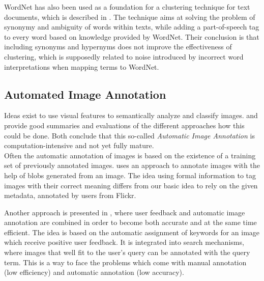 \bigskip
WordNet has also been used as a foundation for a clustering technique for text documents, which is described in \cite{sedding2004wordnet}. The technique aims at solving the problem of synonymy and ambiguity of words within texts, while adding a part-of-speech tag to every word based on knowledge provided by WordNet. Their conclusion is that including synonyms and hypernyms does not improve the effectiveness of clustering, which is supposedly related to noise introduced by incorrect word interpretations when mapping terms to WordNet.

\subsection{Automated Image Annotation}

Ideas exist to use visual features to semantically analyze and classify images. \cite{Liu2007} and \cite{Zhang2012} provide good summaries and evaluations of the different approaches how this could be done. Both conclude that this so-called \emph{Automatic Image Annotation}  is computation-intensive and not yet fully mature. \\
Often the automatic annotation of images is based on the existence of a training set of previously annotated images.  \cite{jeon2003automatic}	uses an approach to annotate images with the help of blobs generated from an image. The idea using formal information to tag images with their correct meaning differs from our basic idea to rely on the given metadata, annotated by users from Flickr.

\bigskip
Another approach is presented in \cite{wenyin2001semi}, where user feedback and automatic image annotation are combined in order to become both accurate and at the same time efficient. The idea is based on the automatic assignment of keywords for an image which receive positive user feedback. It is integrated into search mechanisms, where images that well fit to the user's query can be annotated with the query term. This is a way to face the problems which come with manual annotation (low efficiency) and automatic annotation (low accuracy).


